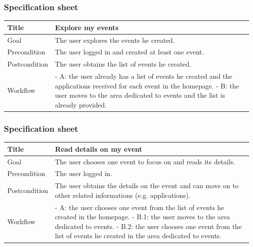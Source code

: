 \documentclass{beamer}
\begin{document}
\begin{frame}
    \frametitle{Specification sheet}
    \begin{table}
        \tiny
        \begin{tabular}{|p{2cm}|p{6cm}|}
        \hline
        Title & \textbf{Explore my events} \\
        \hline
        Goal & The user explores the events he created. \\
        \hline
        Precondition & The user logged in and created at least one event.\\
        \hline
        Postcondition & The user obtains the list of events he created. \\
        \hline
        Workflow &
        - A: the user already has a list of events he created and the applications received for each event 
        in the homepage. \newline
        - B: the user moves to the area dedicated to events and the list is already provided. \\
        \hline
        \end{tabular}
\end{table}
\end{frame}


\begin{frame}
    \frametitle{Specification sheet}
    \begin{table}
        \tiny
        \begin{tabular}{|p{2cm}|p{6cm}|}
        \hline
        Title & \textbf{Read details on my event} \\
        \hline
        Goal & The user chooses one event to focus on and reads its details. \\
        \hline
        Precondition & The user logged in. \\
        \hline
        Postcondition & The user obtains the details on the event and 
        can move on to other related informations (e.g. applications). \\
        \hline
        Workflow &
        - A: the user chooses one event from the list of events he created in the homepage. \newline
        - B.1: the user moves to the area dedicated to events. \newline
        - B.2: the user chooses one event from the list of events he created in the area dedicated to events. \\
        \hline
        \end{tabular}
\end{table}
\end{frame}
\end{document}
